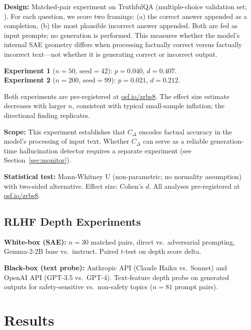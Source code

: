 \documentclass[10pt]{article}
\begin{document}
\textbf{Design:} Matched-pair experiment on TruthfulQA (multiple-choice validation set; \citealt{lin2022}). For each question, we score two framings: (a) the correct answer appended as a completion, (b) the most plausible incorrect answer appended. Both are fed as input prompts; no generation is performed. This measures whether the model's internal SAE geometry differs when processing factually correct versus factually incorrect text---not whether it is generating correct or incorrect output.

\textbf{Experiment 1} ($n{=}50$, seed$=$42): $p = 0.040$, $d = 0.407$.\\
\textbf{Experiment 2} ($n{=}200$, seed$=$99): $p = 0.021$, $d = 0.212$.

Both experiments are pre-registered at \href{https://osf.io/zrbs8}{osf.io/zrbs8}. The effect size estimate decreases with larger $n$, consistent with typical small-sample inflation; the directional finding replicates.

\textbf{Scope:} This experiment establishes that $C_{\Delta}$ encodes factual accuracy in the model's processing of input text. Whether $C_{\Delta}$ can serve as a reliable generation-time hallucination detector requires a separate experiment (see Section~\ref{sec:monitor}).

\textbf{Statistical test:} Mann-Whitney U (non-parametric; no normality assumption) with two-sided alternative. Effect size: Cohen's $d$. All analyses pre-registered at \href{https://osf.io/zrbs8}{osf.io/zrbs8}.

\subsection{RLHF Depth Experiments}

\textbf{White-box (SAE):} $n{=}30$ matched pairs, direct vs.\ adversarial prompting, Gemma-2-2B base vs.\ instruct. Paired $t$-test on depth score delta.

\textbf{Black-box (text probe):} Anthropic API (Claude Haiku vs.\ Sonnet) and OpenAI API (GPT-3.5 vs.\ GPT-4). Text-feature depth probe on generated outputs for safety-sensitive vs.\ non-safety topics ($n{=}81$ prompt pairs).

\section{Results}
\end{document}
